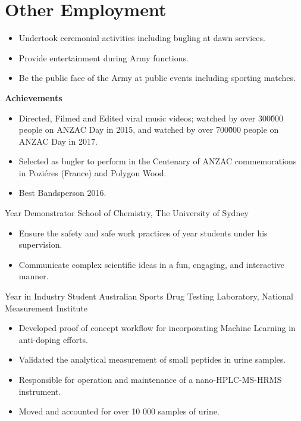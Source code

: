 \section{Other Employment}

{}{}
{%
\begin{itemize}
  \item Undertook ceremonial activities including bugling at dawn services.
  \item Provide entertainment during Army functions.
  \item Be the public face of the Army at public events including sporting matches.
\end{itemize}
\textbf{Achievements}
\begin{itemize}
  \item Directed, Filmed and Edited viral music videos;
     watched by over 300\~000 people on ANZAC Day in 2015,
    and  watched by over 700\~000 people on ANZAC Day in 2017.
  \item Selected as bugler to perform in the Centenary of ANZAC commemorations in Poziéres (France) and Polygon Wood.
  \item Best Bandsperson 2016.
\end{itemize}
}

\vspace{1em}

{ Year Demonstrator}
{School of Chemistry, The University of Sydney}
{}{}
{%
  \begin{itemize}
    \item Ensure the safety and safe work practices
      of  year students under his supervision.
    \item Communicate complex scientific ideas
      in a fun, engaging, and interactive manner.
  \end{itemize}
}

{Year in Industry Student}
{Australian Sports Drug Testing Laboratory, National Measurement Institute}
{}{}
{%
  \begin{itemize}
    \item Developed proof of concept workflow for incorporating Machine
      Learning in anti-doping efforts.
    \item Validated the analytical measurement of small peptides in urine samples.
    \item Responsible for operation and maintenance of a nano-HPLC-MS-HRMS instrument.
    \item Moved and accounted for over 10 000 samples of urine.
  \end{itemize}
}

